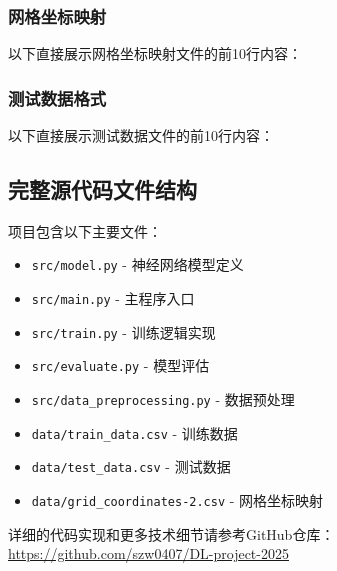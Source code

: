 \documentclass{article}
\begin{document}
\subsubsection{网格坐标映射}
以下直接展示网格坐标映射文件的前10行内容：

\subsubsection{测试数据格式}
以下直接展示测试数据文件的前10行内容：

\subsection{完整源代码文件结构}

项目包含以下主要文件：

\begin{itemize}
    \item \texttt{src/model.py} - 神经网络模型定义
    \item \texttt{src/main.py} - 主程序入口
    \item \texttt{src/train.py} - 训练逻辑实现
    \item \texttt{src/evaluate.py} - 模型评估
    \item \texttt{src/data\_preprocessing.py} - 数据预处理
    \item \texttt{data/train\_data.csv} - 训练数据
    \item \texttt{data/test\_data.csv} - 测试数据
    \item \texttt{data/grid\_coordinates-2.csv} - 网格坐标映射
\end{itemize}

详细的代码实现和更多技术细节请参考GitHub仓库：\url{https://github.com/szw0407/DL-project-2025}
\end{document}

